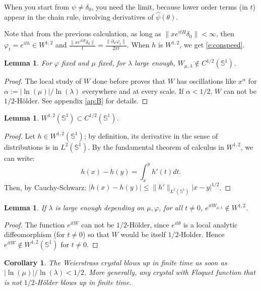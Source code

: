 \documentclass[11pt]{amsart}
\theoremstyle{plain}
\newtheorem{lemma}[theorem]{Lemma}
\newtheorem{corollary}[theorem]{Corollary}
\theoremstyle{definition}
\numberwithin{equation}{section}
\begin{document}
When you start from $\psi\neq \delta_0$, you need the limit, because lower order terms (in $t$) appear in the chain rule, involving derivatives of $\widehat{\psi}(\theta)$.

Note that from the previous calculation, as long as $\|xe^{itH}\delta_0\|<\infty$, then $\varphi_t=e^{ith}\in W^{1,2}$ and $\frac{\| x e^{itH}\delta_0\|}{t}=\frac{\|\partial_w \varphi_t\|}{2\pi t}$. When $h$ is $W^{1,2}$, we get \eqref{e:conspeed}.


\begin{lemma}
For $\varphi$ fixed and $\mu$ fixed, for $\lambda$ large enough, $W_{\mu,\lambda} \notin C^{1/2}(\mathbb{S}^1)$.
\end{lemma}

\begin{proof}
The local study of $W$ done before proves that $W$ has oscillations like $x^\alpha$ for $\alpha:=|\ln(\mu)|/\ln(\lambda)$ everywhere and at every scale. If $\alpha<1/2$, $W$ can not be $1/2$-Hölder. See appendix \ref{ap:B} for details.
\end{proof}

\begin{lemma}
$W^{1,2}(\mathbb{S}^1) \subset C^{1/2}(\mathbb{S}^1)$.
\end{lemma}



\begin{proof}
Let $h \in W^{1,2}(\mathbb{S}^1)$; by definition, its derivative in the sense of distributions is in $L^2(\mathbb{S}^1)$. By the fundamental theorem of calculus in $W^{1,2}$, we can write:
$$ h(x)-h(y) = \int_x^y h'(t)dt.$$
Then, by Cauchy-Schwarz:
$ |h(x)-h(y)| \leq \|h'\|_{L^2(\mathbb{S}^1)} |x-y|^{1/2} $.
\end{proof}

\begin{lemma}
If $\lambda$ is large enough depending on $\mu,\varphi$, for all $t \neq 0$, $e^{i t W_{\mu,\lambda}} \notin W^{1,2}$.
\end{lemma}

\begin{proof}
The function $e^{it W}$ can not be $1/2$-Hölder, since $e^{it \theta}$ is a local analytic diffeomorphism (for $t \neq 0$) so that $W$ would be itself $1/2$-Holder. Hence $e^{it W} \notin W^{1,2}(\mathbb{S}^1)$ for $t \neq 0$.
\end{proof}

\begin{corollary}\label{cor:transport}
The Weierstrass crystal blows up in finite time as soon as $|\ln(\mu)|/\ln(\lambda) < 1/2$.
More generally, any crystal with Floquet function that is not $1/2$-Hölder blows up in finite time.
\end{corollary}
\end{document}
